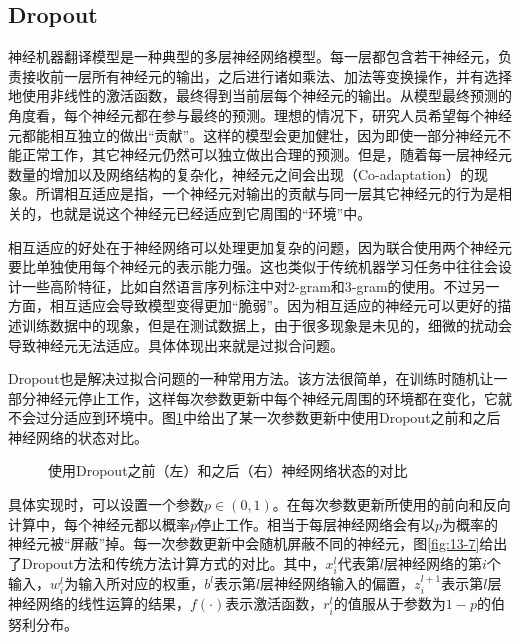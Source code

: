 
\subsection{Dropout}

\parinterval 神经机器翻译模型是一种典型的多层神经网络模型。每一层都包含若干神经元，负责接收前一层所有神经元的输出，之后进行诸如乘法、加法等变换操作，并有选择地使用非线性的激活函数，最终得到当前层每个神经元的输出。从模型最终预测的角度看，每个神经元都在参与最终的预测。理想的情况下，研究人员希望每个神经元都能相互独立的做出“贡献”。这样的模型会更加健壮，因为即使一部分神经元不能正常工作，其它神经元仍然可以独立做出合理的预测。但是，随着每一层神经元数量的增加以及网络结构的复杂化，神经元之间会出现{\small{}}（Co-adaptation）的现象。所谓相互适应是指，一个神经元对输出的贡献与同一层其它神经元的行为是相关的，也就是说这个神经元已经适应到它周围的“环境”中。

\parinterval 相互适应的好处在于神经网络可以处理更加复杂的问题，因为联合使用两个神经元要比单独使用每个神经元的表示能力强。这也类似于传统机器学习任务中往往会设计一些高阶特征，比如自然语言序列标注中对2-gram和3-gram的使用。不过另一方面，相互适应会导致模型变得更加“脆弱”。因为相互适应的神经元可以更好的描述训练数据中的现象，但是在测试数据上，由于很多现象是未见的，细微的扰动会导致神经元无法适应。具体体现出来就是过拟合问题。

\parinterval Dropout也是解决过拟合问题的一种常用方法。该方法很简单，在训练时随机让一部分神经元停止工作，这样每次参数更新中每个神经元周围的环境都在变化，它就不会过分适应到环境中。图\ref{fig:13-6}中给出了某一次参数更新中使用Dropout之前和之后神经网络的状态对比。

\begin{figure}[htp]
\centering

\caption{使用Dropout之前（左）和之后（右）神经网络状态的对比}
\label{fig:13-6}
\end{figure}

\parinterval 具体实现时，可以设置一个参数$p \in (0,1)$。在每次参数更新所使用的前向和反向计算中，每个神经元都以概率$p$停止工作。相当于每层神经网络会有以$p$为概率的神经元被“屏蔽”掉。每一次参数更新中会随机屏蔽不同的神经元，图\ref{fig:13-7}给出了Dropout方法和传统方法计算方式的对比。其中，$x_{i}^{l}$代表第$l$层神经网络的第$i$个输入，$w_{i}^{l}$为输入所对应的权重，$b^{l}$表示第$l$层神经网络输入的偏置，$z_{i}^{l+1}$表示第$l$层神经网络的线性运算的结果，$f(\cdot)$表示激活函数，$r_{i}^{l}$的值服从于参数为$1-p$的伯努利分布。

